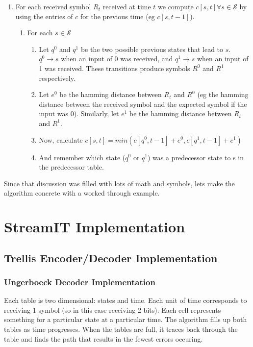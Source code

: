 \documentclass{article}
\begin{document}
\begin{enumerate}
\item For each received symbol $R_t$ received at time $t$ we compute 
       $c[s,t] \forall s \in \mathcal{S}$ by using the entries of $c$ for 
       the previous time (eg $c[s,t-1]$).
	\begin{enumerate}
	\item For each $s \in \mathcal{S}$
		\begin{enumerate}
		\item Let $q^0$ and $q^1$ be the two possible previous states
		       that lead to $s$. $q^0\rightarrow s$ when an input of 0
		       was received, and $q^1\rightarrow s$ when an input of 1 
		       was received. These transitions produce symbols $R^0$ and $R^1$
		       respectively.
		\item Let $e^0$ be the hamming distance between $R_t$ and $R^0$ (eg the hamming
		       distance between the received symbol and the expected symbol if the input was 0). 
		       Similarly, let $e^1$ be the hamming distance between $R_t$ and $R^1$.
		\item Now, calculate $c[s,t] = min(c[q^0,t-1] + e^0, c[q^1,t-1] + e^1)$
		\item And remember which state ($q^0$ or $q^1$) was a predecessor state to s in the 
		       predecessor table.
		\end{enumerate}
	\end{enumerate}
\end{enumerate}

Since that discussion was filled with lots of math and symbols, 
lets make the algorithm concrete with a worked through example.










\section{StreamIT Implementation}


\subsection{Trellis Encoder/Decoder Implementation}

\subsubsection{Ungerboeck Decoder Implementation}
Each table is two dimensional: states and time. Each unit of time corresponds to
receiving 1 symbol (so in this case receiving 2 bits). Each cell represents something
for a particular state at a particular time. The algorithm fills up both tables as
time progresses. When the tables are full, it traces back through the table and finds the
path that results in the fewest errors occuring.
\end{document}
